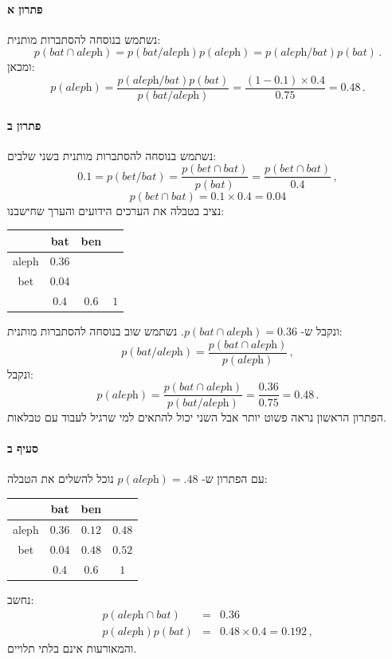 \documentclass[12pt,a4paper]{article}
\begin{document}
\vspace{-2ex}\paragraph{פתרון א}
נשתמש בנוסחה להסתברות מותנית:
\[
p(\textit{bat} \cap \textit{aleph}) =
p(\textit{bat} / \textit{aleph}) p(\textit{aleph}) =
p(\textit{aleph} / \textit{bat}) p(\textit{bat})\,.
\]
ומכאן:
\[
p(\textit{aleph}) = \frac{p(\textit{aleph} / \textit{bat}) p(\textit{bat})}{p(\textit{bat} / \textit{aleph})}= \frac{(1-0.1)\times 0.4}{0.75} = 0.48\,.
\]

\vspace{-2ex}\paragraph{פתרון ב}
נשתמש בנוסחה להסתברות מותנית בשני שלבים:
\[
0.1 = p(\textit{bet}/\textit{bat}) = \frac{p(\textit{bet}\cap\textit{bat})}{p(\textit{bat})} = \frac{p(\textit{bet}\cap\textit{bat})}{0.4}\,,
\]
\[
p(\textit{bet}\cap\textit{bat}) = 0.1 \times 0.4 = 0.04
\]
נציב בטבלה את הערכים הידועים והערך שחישבנו:
\begin{center}
\renewcommand{\arraystretch}{1.2}
\setlength{\tabcolsep}{12pt}
\begin{tabular}{|c|c|c|c|}
\hline
&bat&ben&\\\hline
aleph&$0.36$&&\\\hline
bet&$0.04$&&\\\hline
&$0.4$&$0.6$&$1$\\\hline
\end{tabular}
\end{center}
ונקבל ש-
$p(\textit{bat}\cap\textit{aleph})=0.36$.
נשתמש שוב בנוסחה להסתברות מותנית:
\[
p(\textit{bat}/\textit{aleph}) = \frac{p(\textit{bat}\cap\textit{aleph})}{p(\textit{aleph})}\,,
\]
ונקבל:
\[
p(\textit{aleph}) = \frac{p(\textit{bat}\cap\textit{aleph})}{p(\textit{bat}/\textit{aleph})} = \frac{0.36}{0.75} = 0.48\,.
\]
הפתרון הראשון נראה פשוט יותר אבל השני יכול להתאים למי שרגיל לעבוד עם טבלאות.

\vspace{-2ex}\paragraph{סעיף ב}

עם הפתרון ש-
$p(\textit{aleph})=.48$
נוכל להשלים את הטבלה:
\begin{center}
\renewcommand{\arraystretch}{1.2}
\setlength{\tabcolsep}{12pt}
\begin{tabular}{|c|c|c|c|}
\hline
&bat&ben&\\\hline
aleph&$0.36$&$0.12$&$0.48$\\\hline
bet&$0.04$&$0.48$&$0.52$\\\hline
&$0.4$&$0.6$&$1$\\\hline
\end{tabular}
\end{center}
נחשב:
\begin{eqnarray*}
p(\textit{aleph}\cap \textit{bat})&=&0.36\\
p(\textit{aleph}) p(\textit{bat})&=&0.48\times 0.4 = 0.192\,,
\end{eqnarray*}
והמאורעות אינם בלתי תלויים.
\end{document}
